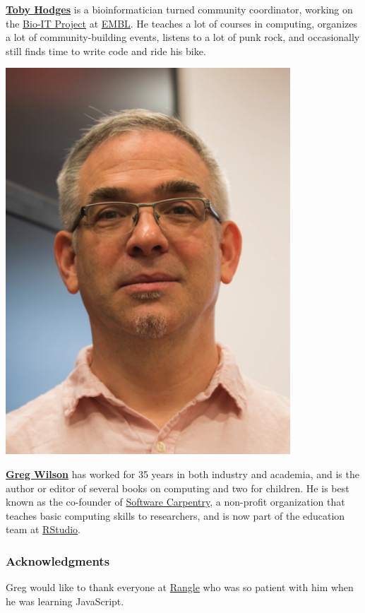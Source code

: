 \textbf{\href{https://tbyhdgs.info/}{Toby Hodges}} is a bioinformatician
turned community coordinator, working on the
\href{https://bio-it.embl.de}{Bio-IT Project} at
\href{https://www.embl.de}{EMBL}. He teaches a lot of courses in
computing, organizes a lot of community-building events, listens to a
lot of punk rock, and occasionally still finds time to write code and
ride his bike.

\includegraphics[width=0.80000\textwidth]{../../files/greg-wilson.png}

\textbf{\href{http://third-bit.com}{Greg Wilson}} has worked for 35
years in both industry and academia, and is the author or editor of
several books on computing and two for children. He is best known as the
co-founder of \href{http://carpentries.org}{Software Carpentry}, a
non-profit organization that teaches basic computing skills to
researchers, and is now part of the education team at
\href{http://rstudio.com}{RStudio}.

\subsubsection{Acknowledgments}\label{s:intro-acknowledgments}

Greg would like to thank everyone at \href{https://rangle.io/}{Rangle}
who was so patient with him when he was learning JavaScript.

